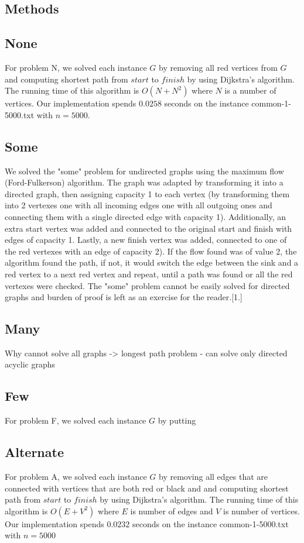 \documentclass{tufte-handout}
\begin{document}
\subsection{Methods}

\subsection{None}

For problem N, we solved each instance $G$ by removing all red vertices from $G$ and computing shortest path from $start$ to $finish$  by using Dijkstra's algorithm. 
The running time of this algorithm is $O(N + N^2)$ where $N$ is a number of vertices. Our implementation spends $0.0258$ seconds on the instance common-1-5000.txt with $n=5000$.

\subsection{Some}

We solved the "some" problem for undirected graphs using the maximum flow (Ford-Fulkerson) algorithm. The graph was adapted by transforming it into a directed graph, then assigning capacity 1 to each vertex (by transforming them into 2 vertexes one with all incoming edges one with all outgoing ones and connecting them with a single directed edge with capacity 1). Additionally, an extra start vertex was added and connected to the original start and finish with edges of capacity 1. Lastly, a new finish vertex was added, connected to one of the red vertexes with an edge of capacity 2). If the flow found was of value 2, the algorithm found the path, if not, it would switch the edge between the sink and a red vertex to a next red vertex and repeat, until a path was found or all the red vertexes were checked.
The "some" problem cannot be easily solved for directed graphs and burden of proof is left as an exercise for the reader.[1.]

\subsection{Many}
Why cannot solve all graphs -> longest path problem - can solve only directed acyclic graphs

\subsection{Few}

For problem F, we solved each instance $G$ by putting 

\subsection{Alternate}

For  problem A, we solved each instance $G$ by removing all edges that are connected with vertices that are both red or black and and computing shortest path from $start$ to $finish$ by using Dijkstra's algorithm.
The running time of this algorithm is $O(E + V^2)$ where  $E$ is number of edges and $V$ is number of vertices. Our implementation spends $0.0232$ seconds on the instance common-1-5000.txt with $n = 5000$
\end{document}
